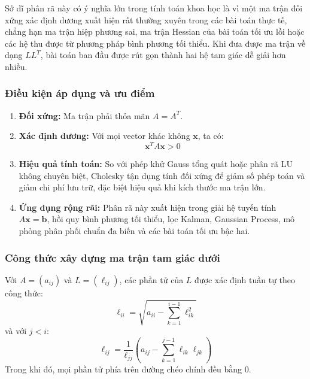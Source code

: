 \documentclass[12pt,a4paper]{article}
\begin{document}
\noindent Sở dĩ phân rã này có ý nghĩa lớn trong tính toán khoa học là vì một ma trận đối xứng xác định dương xuất hiện rất thường xuyên trong các bài toán thực tế, chẳng hạn ma trận hiệp phương sai, ma trận Hessian của bài toán tối ưu lồi hoặc các hệ thu được từ phương pháp bình phương tối thiểu\cite{ref3}. Khi đưa được ma trận về dạng $LL^T$, bài toán ban đầu được rút gọn thành hai hệ tam giác dễ giải hơn nhiều.

\subsubsection{Điều kiện áp dụng và ưu điểm}

\begin{enumerate}[label=\textbf{\alph*)}, leftmargin=*, align=left]
    \item \textbf{Đối xứng:} Ma trận phải thỏa mãn $A = A^T$.

    \item \textbf{Xác định dương:} Với mọi vector khác không $\mathbf{x}$, ta có:
    \begin{equation}
    \mathbf{x}^T A \mathbf{x} > 0
    \end{equation}

    \item \textbf{Hiệu quả tính toán:} So với phép khử Gauss tổng quát hoặc phân rã LU không chuyên biệt, Cholesky tận dụng tính đối xứng để giảm số phép toán và giảm chi phí lưu trữ, đặc biệt hiệu quả khi kích thước ma trận lớn.

    \item \textbf{Ứng dụng rộng rãi:} Phân rã này xuất hiện trong giải hệ tuyến tính $A\mathbf{x}=\mathbf{b}$, hồi quy bình phương tối thiểu, lọc Kalman, Gaussian Process, mô phỏng phân phối chuẩn đa biến và các bài toán tối ưu bậc hai\cite{ref3}.
\end{enumerate}

\subsubsection{Công thức xây dựng ma trận tam giác dưới}

\begin{infobox}
Với $A = (a_{ij})$ và $L = (\ell_{ij})$, các phần tử của $L$ được xác định tuần tự theo công thức:
\begin{equation}
\ell_{ii} = \sqrt{a_{ii} - \sum_{k=1}^{i-1} \ell_{ik}^2}
\end{equation}
và với $j < i$:
\begin{equation}
\ell_{ij} = \frac{1}{\ell_{jj}}\left(a_{ij} - \sum_{k=1}^{j-1} \ell_{ik}\ell_{jk}\right)
\end{equation}
Trong khi đó, mọi phần tử phía trên đường chéo chính đều bằng $0$.
\end{infobox}
\end{document}

